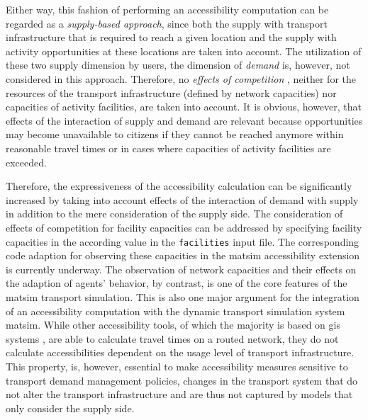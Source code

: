 Either way, this fashion of performing an accessibility computation can be regarded as a \emph{supply-based approach}, 
since both the supply with transport infrastructure that is required to reach a given location and the supply with 
activity opportunities at these locations are taken into account. The utilization of these two supply dimension by users, 
\ie the dimension of \emph{demand} is, however, not considered in this approach. Therefore, no 
\emph{effects of competition} \citep{Geurs2004AccessibilityReview}, neither for the resources of the transport 
infrastructure (defined by network capacities) nor capacities of activity facilities, are taken into account. It is 
obvious, however, that effects of the interaction of supply and demand are relevant because opportunities may become 
unavailable to citizens if they cannot be reached anymore within reasonable travel times or in cases where capacities 
of activity facilities are exceeded. 

Therefore, the expressiveness of the accessibility calculation can be significantly increased by taking into account 
effects of the interaction of demand with supply in addition to the mere consideration of the supply side. The consideration
of effects of competition for facility capacities can be addressed by specifying facility capacities in the 
according value in the \lstinline{facilities} input file. The corresponding code adaption for observing these capacities 
in the \gls{matsim} accessibility extension is currently underway. The observation of network capacities and 
their effects on the adaption of agents' behavior, by contrast, is one of the core features of the \gls{matsim} transport 
simulation. 
This is also one major argument for the integration of an 
accessibility computation with the dynamic transport simulation system \gls{matsim}. While other accessibility tools, of 
which the majority is based on \gls{gis} systems
\citep{BBSR20xxErreichbarkeitsmodell, CurtisEtAl2013AccessibilityPolicyInnovation, BuettnerEtAl2010Erreichbarkeitsatlas, LiuZhu2004AccessibilityAnalyst, GulhanEtAl2014PotentialAccessibilityMeasureDenizli}
, are able to calculate travel times on a routed network, they 
do not calculate accessibilities dependent on the usage level of transport infrastructure. 
This property, is, however, essential to make accessibility measures sensitive to transport demand management policies, 
\ie changes in the transport system that do not alter the transport infrastructure and are thus not captured by models 
that only consider the supply side.


